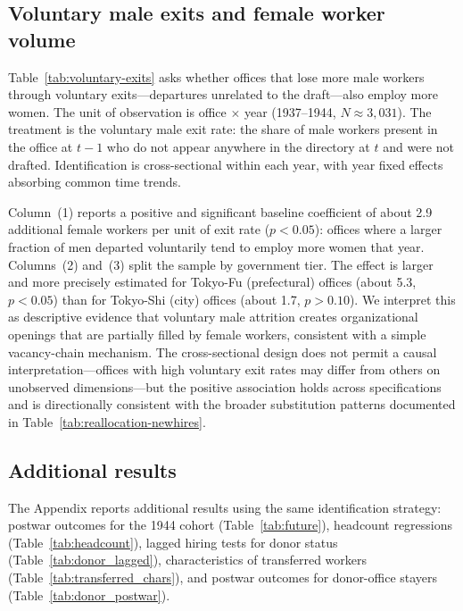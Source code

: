 \subsection{Voluntary male exits and female worker volume}

Table~\ref{tab:voluntary-exits} asks whether offices that lose more male workers through voluntary exits---departures unrelated to the draft---also employ more women. The unit of observation is office $\times$ year (1937--1944, $N \approx 3{,}031$). The treatment is the voluntary male exit rate: the share of male workers present in the office at $t-1$ who do not appear anywhere in the directory at $t$ and were not drafted. Identification is cross-sectional within each year, with year fixed effects absorbing common time trends.

Column~(1) reports a positive and significant baseline coefficient of about 2.9 additional female workers per unit of exit rate ($p<0.05$): offices where a larger fraction of men departed voluntarily tend to employ more women that year. Columns~(2) and~(3) split the sample by government tier. The effect is larger and more precisely estimated for Tokyo-Fu (prefectural) offices (about 5.3, $p<0.05$) than for Tokyo-Shi (city) offices (about 1.7, $p>0.10$). We interpret this as descriptive evidence that voluntary male attrition creates organizational openings that are partially filled by female workers, consistent with a simple vacancy-chain mechanism. The cross-sectional design does not permit a causal interpretation---offices with high voluntary exit rates may differ from others on unobserved dimensions---but the positive association holds across specifications and is directionally consistent with the broader substitution patterns documented in Table~\ref{tab:reallocation-newhires}.

\subsection{Additional results}

The Appendix reports additional results using the same identification strategy: postwar outcomes for the 1944 cohort (Table~\ref{tab:future}), headcount regressions (Table~\ref{tab:headcount}), lagged hiring tests for donor status (Table~\ref{tab:donor_lagged}), characteristics of transferred workers (Table~\ref{tab:transferred_chars}), and postwar outcomes for donor-office stayers (Table~\ref{tab:donor_postwar}).
